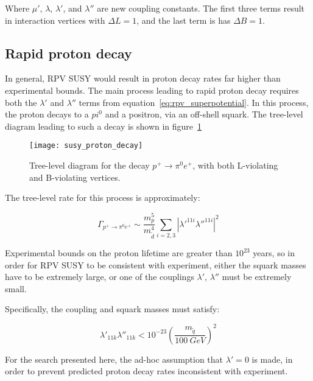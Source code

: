 Where $\mu'$, $\lambda$, $\lambda'$, and $\lambda''$ are new coupling constants.
The first three terms result in interaction vertices with $\Delta L = 1$,
and the last term is has $\Delta B = 1$.

\subsection{Rapid proton decay}\label{subsec:proton_decay}

In general, RPV SUSY would result in proton decay rates far higher than experimental bounds.
The main process leading to rapid proton decay requires both the $\lambda'$ and $\lambda''$ terms from equation~\ref{eq:rpv_superpotential}.
In this process, the proton decays to a $pi^0$ and a positron, via an off-shell squark.
The tree-level diagram leading to such a decay is shown in figure~\ref{fig:susy_proton_decay}

\begin{figure}[h!]
    \centering
\texttt{[image: susy\_proton\_decay]}
\caption{Tree-level diagram for the decay $p^+ \rightarrow \pi^0 e^+$, with both L-violating and B-violating vertices.}
\label{fig:susy_proton_decay}
\end{figure}\cite{susy-primer-1998}

The tree-level rate for this process is approximately:

\begin{equation}\label{eq:proton_decay_rate}
    \Gamma_{p^+ \rightarrow \pi^0 e^+} \sim \frac{m_p^5}{m_{\tilde{d}}^4} \sum_{i=2,3}\left|\lambda'^{11i}\lambda''^{11i}\right|^2
\end{equation}\cite{susy-primer-1998}

Experimental bounds on the proton lifetime are greater than $10^{23}$ years,
so in order for RPV SUSY to be consistent with experiment,
either the squark masses have to be extremely large, or one of the couplings $\lambda'$, $\lambda''$ must be extremely small.

Specifically, the coupling and squark masses must satisfy:

\begin{equation}\label{eq:rpv_constraint}
    \lambda'_{11k} \lambda''_{11k} < 10^{-23} \left(\frac{m_{\tilde{q}}}{100~GeV}\right)^2
\end{equation}\cite{susy-rpv-constraints}

For the search presented here, the ad-hoc assumption that $\lambda' = 0$ is made, in order to prevent predicted proton
decay rates inconsistent with experiment.

